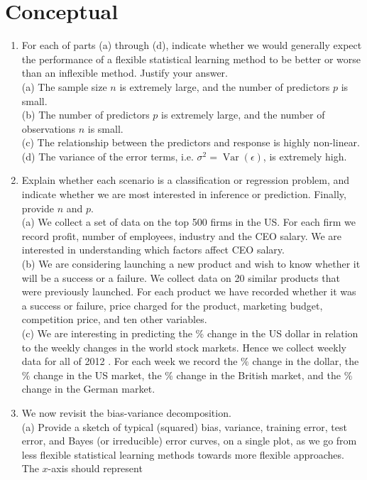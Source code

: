 \documentclass[10pt]{article}
\begin{document}
\section*{Conceptual}
\begin{enumerate}
  \item For each of parts (a) through (d), indicate whether we would generally expect the performance of a flexible statistical learning method to be better or worse than an inflexible method. Justify your answer.\\
(a) The sample size $n$ is extremely large, and the number of predictors $p$ is small.\\
(b) The number of predictors $p$ is extremely large, and the number of observations $n$ is small.\\
(c) The relationship between the predictors and response is highly non-linear.\\
(d) The variance of the error terms, i.e. $\sigma^{2}=\operatorname{Var}(\epsilon)$, is extremely high.
  \item Explain whether each scenario is a classification or regression problem, and indicate whether we are most interested in inference or prediction. Finally, provide $n$ and $p$.\\
(a) We collect a set of data on the top 500 firms in the US. For each firm we record profit, number of employees, industry and the CEO salary. We are interested in understanding which factors affect CEO salary.\\
(b) We are considering launching a new product and wish to know whether it will be a success or a failure. We collect data on 20 similar products that were previously launched. For each product we have recorded whether it was a success or failure, price charged for the product, marketing budget, competition price, and ten other variables.\\
(c) We are interesting in predicting the \% change in the US dollar in relation to the weekly changes in the world stock markets. Hence we collect weekly data for all of 2012 . For each week we record the $\%$ change in the dollar, the $\%$ change in the US market, the $\%$ change in the British market, and the \% change in the German market.
  \item We now revisit the bias-variance decomposition.\\
(a) Provide a sketch of typical (squared) bias, variance, training error, test error, and Bayes (or irreducible) error curves, on a single plot, as we go from less flexible statistical learning methods towards more flexible approaches. The $x$-axis should represent\\

\end{enumerate}
\end{document}
